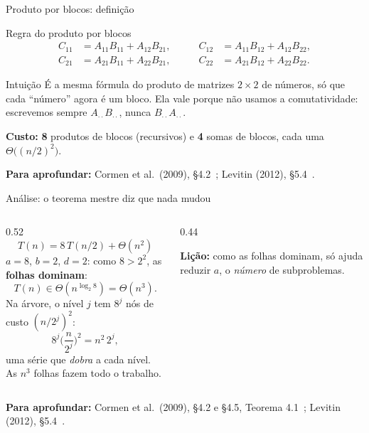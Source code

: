 \documentclass[aspectratio=169,xcolor=table]{beamer}
\newcommand{\fonte}[1]{%
  \vfill
  {\tiny\color{gray!55!black}\textbf{Para aprofundar:} #1\par}%
}
\begin{document}
\begin{frame}{Produto por blocos: definição}
  \begin{block}{Regra do produto por blocos}
    \scriptsize
    \[
      \begin{aligned}
        C_{11} &= A_{11}B_{11} + A_{12}B_{21}, &\qquad C_{12} &= A_{11}B_{12} + A_{12}B_{22},\\
        C_{21} &= A_{21}B_{11} + A_{22}B_{21}, &\qquad C_{22} &= A_{21}B_{12} + A_{22}B_{22}.
      \end{aligned}
    \]
  \end{block}
  \begin{exampleblock}{Intuição}
    \scriptsize É a mesma fórmula do produto de matrizes $2\times 2$ de números, só que cada
    ``número'' agora é um bloco. Ela vale porque não usamos a comutatividade: escrevemos
    sempre $A_{\cdot\cdot}B_{\cdot\cdot}$, nunca $B_{\cdot\cdot}A_{\cdot\cdot}$.
    \smallskip

    \textbf{Custo:} \textbf{8} produtos de blocos (recursivos) e \textbf{4} somas de blocos,
    cada uma $\Theta\big((n/2)^2\big)$.
  \end{exampleblock}
  \fonte{Cormen et al.\ (2009), \S 4.2~\cite{cormen2009introduction};
    Levitin (2012), \S 5.4~\cite{levitin2012introduction}.}
\end{frame}

\begin{frame}{Análise: o teorema mestre diz que nada mudou}
  \begin{columns}[c]
    \begin{column}{0.52\textwidth}
      \scriptsize
      \[ T(n) = 8\,T(n/2) + \Theta(n^2) \]
      $a=8$, $b=2$, $d=2$: como $8 > 2^2$, as \textbf{folhas dominam}:
      \[ T(n)\in\Theta(n^{\log_2 8}) = \Theta(n^3). \]
      Na árvore, o nível $j$ tem $8^j$ nós de custo $(n/2^j)^2$:
      \[ 8^j\Big(\frac{n}{2^j}\Big)^2 = n^2\,2^j, \]
      uma série que \emph{dobra} a cada nível. As $n^3$ folhas fazem todo o trabalho.
    \end{column}
    \begin{column}{0.44\textwidth}
      \centering
      \medskip

      \scriptsize\textbf{Lição:} como as folhas dominam, só ajuda reduzir $a$, o
      \emph{número} de subproblemas.
    \end{column}
  \end{columns}
  \fonte{Cormen et al.\ (2009), \S 4.2 e \S 4.5, Teorema 4.1~\cite{cormen2009introduction};
    Levitin (2012), \S 5.4~\cite{levitin2012introduction}.}
\end{frame}
\end{document}
